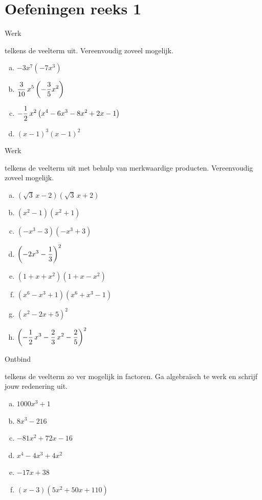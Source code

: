 \documentclass{ximera}
\begin{document}
\section*{Oefeningen reeks 1}
\begin{exercise} 
\hypertarget{oef4.1}{Werk} telkens de veelterm uit. Vereenvoudig zoveel mogelijk. 
\begin{multicols}{2}
\begin{enumerate}[(a)]
\item
$-3x^7\left(-7x^3\right)$
\item
$\displaystyle \frac{3}{10}\,x^5\left(-\frac{3}{5}x^2\right)$
\item
$\displaystyle -\frac{1}{2}\,x^2\left(x^4-6x^3-8x^2+2x-1\right)$
\item
$(x-1)^3(x-1)^2$
\end{enumerate}
\end{multicols}
\end{exercise} 

\begin{exercise} 
\hypertarget{oef4.2}{Werk} telkens de veelterm uit met behulp van merkwaardige producten. Vereenvoudig zoveel mogelijk. 
\begin{multicols}{2}
\begin{enumerate}[(a)]
\item
$(\sqrt{3}\,x-2)(\sqrt{3}\,x+2)$
\item
$(x^2-1)(x^2+1)$
\item
$(-x^3-3)(-x^3+3)$
\item
$\displaystyle \left(-2x^3-\frac{1}{3}\right)^2$
\item
$(1+x+x^2)(1+x-x^2)$
\item
$(x^6-x^3+1)(x^6+x^3-1)$
\item
$(x^2-2x+5)^2$
\item
$\displaystyle \left(-\frac{1}{2}\,x^3 - \frac{2}{3}\,x^2-\frac{2}{5}\right)^2$
\end{enumerate}
\end{multicols}
\end{exercise} 

\begin{exercise} 
\hypertarget{oef4.3}{Ontbind} telkens de veelterm zo ver mogelijk in factoren. Ga algebra\"isch te werk en schrijf jouw redenering uit.  
\begin{multicols}{2}
\begin{enumerate}[(a)]
\item
$1000 x^3 + 1$
\item
$8x^3-216$
\item
$-81x^2+72x-16$
\item
$x^4-4x^3+4x^2$
\item
$-17x+38$
\item
$(x-3)(5x^2+50x+110)$
\end{enumerate}
\end{multicols}
\end{exercise} 
\end{document}
